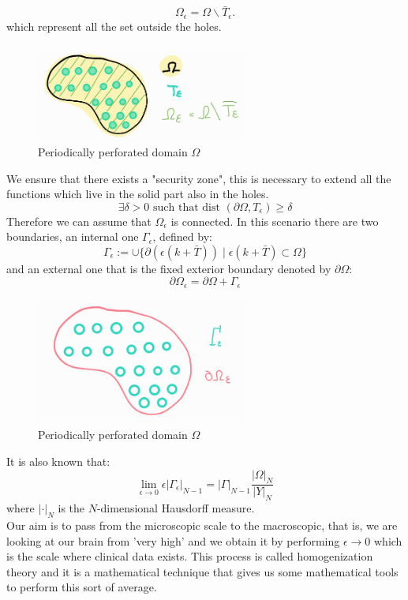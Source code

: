 $$
\Omega_{\epsilon}=\Omega \backslash \bar{T}_{\epsilon} .
$$
which represent all the set outside the holes.\\

\begin{figure}[H]
   \centering
   \includegraphics[width=7cm]{periodicallyperforateddomain.jpg}
   \caption{Periodically perforated domain $\Omega$}
    \label{fig:Omega_epsilon}
\end{figure}

We ensure that there exists a "security zone", this is necessary to extend all the functions which live in the solid part also in the holes.
\begin{equation}
  \exists \delta>0 \text { such that dist }\left(\partial \Omega, T_{\epsilon}\right) \geq \delta
\label{eq 8}\end{equation}
Therefore we can assume that $\Omega_{\epsilon}$ is connected. In this scenario there are two boundaries, an internal one $\Gamma_{\epsilon}$, defined by:
$$
\Gamma_{\epsilon}:=\cup\{\partial(\epsilon(k+\bar{T})) \mid \epsilon(k+\bar{T}) \subset \Omega\}
$$
and an external one that is the fixed exterior boundary denoted by $\partial \Omega$:
$$
\partial\Omega_{\epsilon}=\partial\Omega+\Gamma_{\epsilon}
$$
\begin{figure}[H]
   \centering
   \includegraphics[width=7cm]{boundary.jpg}
   \caption{Periodically perforated domain $\Omega$}
    \label{fig:Omega_epsilon2}
\end{figure}
It is also known that:
\begin{equation}
  \lim _{\epsilon \rightarrow 0} \epsilon\left|\Gamma_{\epsilon}\right|_{N-1}=|\Gamma|_{N-1} \frac{|\Omega|_{N}}{|Y|_{N}}
\label{eq 9}\end{equation}
where $|\cdot|_{N}$ is the $N$-dimensional Hausdorff measure.\\ Our aim is to pass from the microscopic scale to the macroscopic, that is, we are looking at our brain from 'very high' and we obtain it by performing $\epsilon \rightarrow 0$ which is the scale where clinical data exists. This process is called homogenization theory and it is a mathematical technique that gives us some mathematical tools to perform this sort of average.
